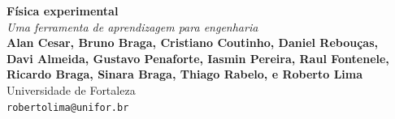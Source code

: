 \documentclass[portrait,a0]{a0poster}
\begin{document}


\begin{minipage}[b]{0.75\linewidth}
\renewcommand{\thefootnote}{\alph{footnote}}
\veryHuge \color{NavyBlue} \textbf{Física experimental} \color{Black}\\ %
\Huge\textit{Uma ferramenta de aprendizagem para engenharia}\\[2cm] %
\huge \textbf{
Alan Cesar\footnotemark[2],
Bruno Braga\footnotemark[1],
Cristiano Coutinho\footnotemark[2],
Daniel Rebouças\footnotemark[5],
}\\[0.5cm] %
\huge \textbf{
Davi Almeida\footnotemark[5],
Gustavo Penaforte\footnotemark[1],
Iasmin Pereira\footnotemark[3],
Raul Fontenele\footnotemark[1],
}\\[0.5cm] %
\huge \textbf{
Ricardo Braga\footnotemark[2],
Sinara Braga\footnotemark[4],
Thiago Rabelo\footnotemark[5],
e Roberto Lima\footnotemark[6]
}\\[0.5cm] %
\huge Universidade de Fortaleza\\[0.4cm] %
\Large \texttt{robertolima@unifor.br} \\
%
\end{minipage}
%
\end{document}
